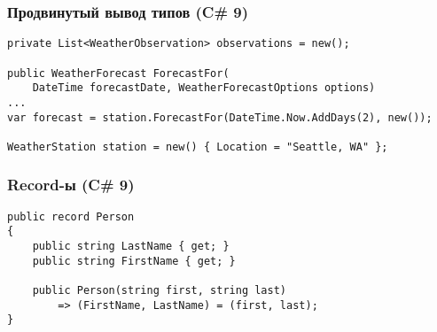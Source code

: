 \documentclass[xetex,mathserif,serif]{beamer}
\begin{document}
    \begin{frame}[fragile]
        \frametitle{Продвинутый вывод типов (C\# 9)}
        \begin{verbatim}
private List<WeatherObservation> observations = new();

public WeatherForecast ForecastFor(
    DateTime forecastDate, WeatherForecastOptions options)
...
var forecast = station.ForecastFor(DateTime.Now.AddDays(2), new());

WeatherStation station = new() { Location = "Seattle, WA" };
        \end{verbatim}
    \end{frame}

    \begin{frame}[fragile]
        \frametitle{Record-ы (C\# 9)}
        \begin{verbatim}
public record Person
{
    public string LastName { get; }
    public string FirstName { get; }

    public Person(string first, string last) 
        => (FirstName, LastName) = (first, last);
}
        \end{verbatim}
    \end{frame}
\end{document}
